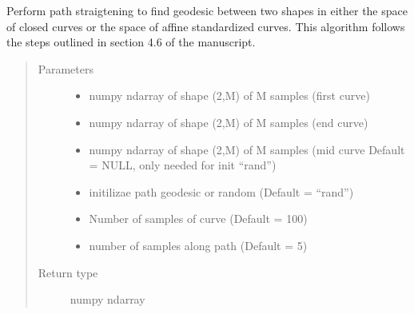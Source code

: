 \documentclass[letterpaper,10pt,english]{sphinxmanual}
\begin{document}

\begin{fulllineitems}
\label{\detokenize{geodesic:geodesic.path_straightening}}
Perform path straigtening to find geodesic between two shapes in either
the space of closed curves or the space of affine standardized curves.
This algorithm follows the steps outlined in section 4.6 of the
manuscript.
\begin{quote}\begin{description}
\item[{Parameters}] \leavevmode\begin{itemize}
\item {} 
 \textendash{} numpy ndarray of shape (2,M) of M samples (first curve)

\item {} 
 \textendash{} numpy ndarray of shape (2,M) of M samples (end curve)

\item {} 
 \textendash{} numpy ndarray of shape (2,M) of M samples (mid curve
Default = NULL, only needed for init “rand”)

\item {} 
 \textendash{} initilizae path geodesic or random (Default = “rand”)

\item {} 
 \textendash{} Number of samples of curve (Default = 100)

\item {} 
 \textendash{} number of samples along path (Default = 5)

\end{itemize}

\item[{Return type}] \leavevmode
numpy ndarray


\end{description}
\end{quote}
\end{fulllineitems}
\end{document}
